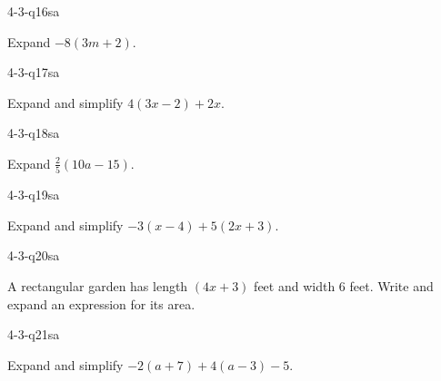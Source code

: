
\begin{practiceQuestion}{4-3-q16}{sa}
\begin{questionText}
Expand $-8(3m + 2)$.
\end{questionText}
\end{practiceQuestion}

\begin{practiceQuestion}{4-3-q17}{sa}
\begin{questionText}
Expand and simplify $4(3x - 2) + 2x$.
\end{questionText}
\end{practiceQuestion}

\begin{practiceQuestion}{4-3-q18}{sa}
\begin{questionText}
Expand $\frac{2}{5}(10a - 15)$.
\end{questionText}
\end{practiceQuestion}

\begin{practiceQuestion}{4-3-q19}{sa}
\begin{questionText}
Expand and simplify $-3(x - 4) + 5(2x + 3)$.
\end{questionText}
\end{practiceQuestion}

\begin{practiceQuestion}{4-3-q20}{sa}
\begin{questionText}
A rectangular garden has length $(4x + 3)$ feet and width $6$ feet. Write and expand an expression for its area.
\end{questionText}
\end{practiceQuestion}

\begin{practiceQuestion}{4-3-q21}{sa}
\begin{questionText}
Expand and simplify $-2(a + 7) + 4(a - 3) - 5$.
\end{questionText}
\end{practiceQuestion}

